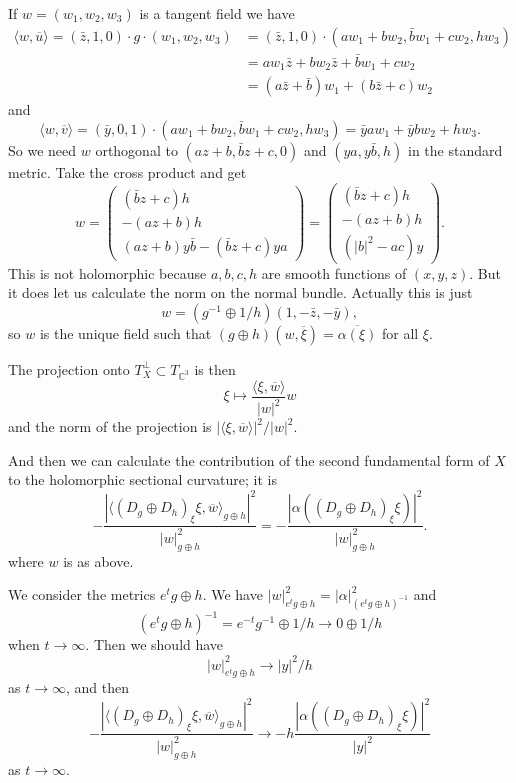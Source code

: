 \documentclass[11pt]{article}
\theoremstyle{definition}
\newcommand{\kk}[1]{\mathbb{#1}}
\def\ov#1{\overline{#1}}
\def\<{\langle}
\def\>{\rangle}
\begin{document}
If $w = (w_1, w_2, w_3)$ is a tangent field we have
\begin{align*}
\<w, \ov u \>
= (\bar z, 1, 0) \cdot g \cdot (w_1, w_2, w_3)
&= (\bar z, 1, 0) \cdot (a w_1 + b w_2, \bar b w_1 + c w_2, h w_3)
\\
&= a w_1 \bar z + b w_2 \bar z + \bar b w_1 + c w_2
\\
&= (a \bar z + \bar b) w_1 + (b \bar z + c) w_2
\end{align*}
and
$$
\< w, \ov v \>
= (\bar y, 0, 1) \cdot (a w_1 + b w_2, \bar b w_1 + c w_2, h w_3)
= \bar y a w_1 + \bar y b w_2 + h w_3.
$$
So we need $w$ orthogonal to $(a z + b, \bar b z + c, 0)$ and $(y a, y
\bar b, h)$ in the standard metric. Take the cross product and get
$$
w
= \begin{pmatrix}
(\bar b z + c)h
\\
- (a z + b) h
\\
(a z + b)y\bar b - (\bar b z + c)ya
\end{pmatrix}
= \begin{pmatrix}
(\bar b z + c)h
\\
- (a z + b) h
\\
(|b|^2 - ac)y
\end{pmatrix}.
$$
This is not holomorphic because $a,b,c,h$ are smooth functions of $(x,y,z)$.
But it does let us calculate the norm on the normal bundle.
Actually this is just
$$
w = (g^{-1} \oplus 1/h)(1, -\bar z, -\bar y),
$$
so $w$ is the unique field such that $(g \oplus h)(w, \ov \xi) = \ov{\alpha(\xi)}$ for all $\xi$.

The projection onto $T_X^\perp \subset T_{\kk C^3}$ is then
$$
\xi \mapsto \frac{\< \xi, \ov w \>}{|w|^2} w
$$
and the norm of the projection is $|\<\xi, \ov w \>|^2/|w|^2$.

And then we can calculate the contribution of the second fundamental form of $X$
to the holomorphic sectional curvature; it is
$$
-\frac{|\< (D_g \oplus D_h)_\xi \xi, \ov w \>_{g \oplus h}|^2}{|w|^2_{g\oplus h}}
= -\frac{|\alpha((D_g \oplus D_h)_\xi \xi)|^2}{|w|^2_{g\oplus h}}.
$$
where $w$ is as above.

We consider the metrics $e^t g \oplus h$.
We have $|w|^2_{e^tg \oplus h} = |\alpha|^2_{(e^tg \oplus h)^{-1}}$
and
$$
(e^tg \oplus h)^{-1}
= e^{-t} g^{-1} \oplus 1/h
\to 0 \oplus 1/h
$$
when $t \to \infty$.
Then we should have
$$
|w|^2_{e^tg \oplus h}
\to |y|^2/h
$$
as $t \to \infty$, and then
$$
-\frac{|\< (D_g \oplus D_h)_\xi \xi, \ov w \>_{g \oplus h}|^2}{|w|^2_{g\oplus h}}
\to -h\frac{|\alpha((D_g \oplus D_h)_\xi \xi)|^2}{|y|^2}
$$
as $t \to \infty$.
\end{document}
